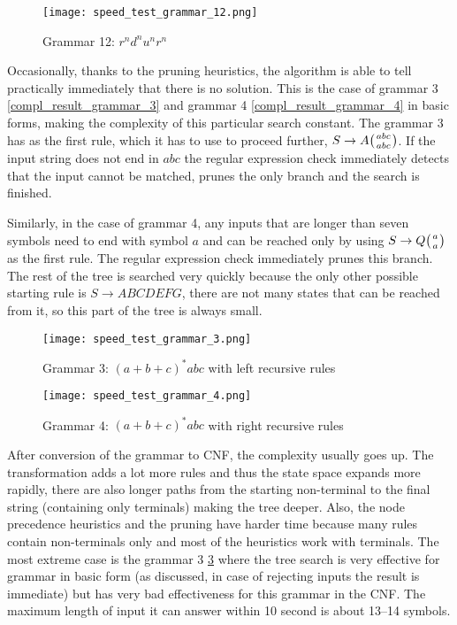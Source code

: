 \begin{figure}[h!]
  \texttt{[image: speed\_test\_grammar\_12.png]}
  \caption{Grammar 12: $r^n d^n u^n r^n$}
  \label{fig:speed_test_grammar_12}
\end{figure}


Occasionally, thanks to the pruning heuristics, the algorithm is able to tell practically immediately that there is no solution. This is the case of grammar 3 \ref{compl_result_grammar_3} and grammar 4 \ref{compl_result_grammar_4} in basic forms, making the complexity of this particular search constant. The grammar 3 has as the first rule, which it has to use to proceed further, $S \rightarrow A \wkpair{abc}{abc}$. If the input string does not end in $abc$ the regular expression check immediately detects that the input cannot be matched, prunes the only branch and the search is finished.

Similarly, in the case of grammar 4, any inputs that are longer than seven symbols need to end with symbol $a$ and can be reached only by using $S \rightarrow Q \wkpair{a}{a}$ as the first rule. The regular expression check immediately prunes this branch. The rest of the tree is searched very quickly because the only other possible starting rule is $S \rightarrow A B C D E F G$, there are not many states that can be reached from it, so this part of the tree is always small.

\begin{figure}[h!]
  \texttt{[image: speed\_test\_grammar\_3.png]}
  \caption{Grammar 3: $(a+b+c)^*abc$ with left recursive rules}
  \label{fig:speed_test_grammar_3}
\end{figure}

\begin{figure}[h!]
  \texttt{[image: speed\_test\_grammar\_4.png]}
  \caption{Grammar 4: $(a+b+c)^*abc$ with right recursive rules}
  \label{fig:speed_test_grammar_4}
\end{figure}

After conversion of the grammar to CNF, the complexity usually goes up. The transformation adds a lot more rules and thus the state space expands more rapidly, there are also longer paths from the starting non-terminal to the final string (containing only terminals) making the tree deeper. Also, the node precedence heuristics and the pruning have harder time because many rules contain non-terminals only and most of the heuristics work with terminals. The most extreme case is the grammar 3 \ref{fig:speed_test_grammar_4} where the tree search is very effective for grammar in basic form (as discussed, in case of rejecting inputs the result is immediate) but has very bad effectiveness for this grammar in the CNF. The maximum length of input it can answer within 10 second is about 13--14 symbols.

